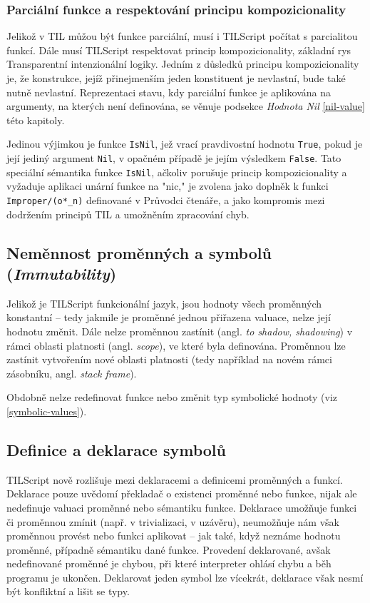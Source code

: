 \subsubsection{Parciální funkce a respektování principu kompozicionality}

Jelikož v TIL můžou být funkce parciální, musí i TILScript počítat s parcialitou funkcí. Dále musí
TILScript respektovat princip kompozicionality, základní rys Transparentní intenzionální logiky.
Jedním z důsledků principu kompozicionality je, že konstrukce, jejíž přinejmenším jeden konstituent
je nevlastní, bude také nutně nevlastní. Reprezentaci stavu, kdy parciální funkce je aplikována
na argumenty, na kterých není definována, se věnuje podsekce \textit{Hodnota Nil} \ref{nil-value}
této kapitoly. 

Jedinou výjimkou je funkce \lstinline{IsNil}, jež vrací pravdivostní hodnotu \lstinline{True},
pokud je její jediný argument \lstinline{Nil}, v opačném případě je jejím výsledkem
\lstinline{False}. Tato speciální sémantika funkce \lstinline{IsNil}, ačkoliv porušuje princip
kompozicionality a vyžaduje aplikaci unární funkce na "nic," je zvolena jako doplněk k funkci
\lstinline{Improper/(o*_n)} definované v Průvodci čtenáře, a jako kompromis mezi dodržením
principů TIL a umožněním zpracování chyb.

\subsection{Neměnnost proměnných a symbolů (\textit{Immutability})}

Jelikož je TILScript funkcionální jazyk, jsou hodnoty všech proměnných konstantní -- tedy
jakmile je proměnné jednou přiřazena valuace, nelze její hodnotu změnit. Dále nelze proměnnou
zastínit (angl. \textit{to shadow, shadowing}) v rámci oblasti platnosti (angl. \textit{scope}),
ve které byla definována. Proměnnou lze zastínit vytvořením nové oblasti platnosti (tedy například
na novém rámci zásobníku, angl. \textit{stack frame}).

Obdobně nelze redefinovat funkce nebo změnit typ symbolické hodnoty (viz \ref{symbolic-values}).

\subsection{Definice a deklarace symbolů}

TILScript nově rozlišuje mezi deklaracemi a definicemi proměnných a funkcí. Deklarace pouze
uvědomí překladač o existenci proměnné nebo funkce, nijak ale nedefinuje valuaci proměnné nebo
sémantiku funkce. Deklarace umožňuje funkci či proměnnou zmínit (např. v trivializaci, v uzávěru),
neumožňuje nám však proměnnou provést nebo funkci aplikovat -- jak také, když neznáme hodnotu
proměnné, případně sémantiku dané funkce. Provedení deklarované, avšak nedefinované proměnné
je chybou, při které interpreter ohlásí chybu a běh programu je ukončen. Deklarovat jeden symbol
lze vícekrát, deklarace však nesmí být konfliktní a lišit se typy.

